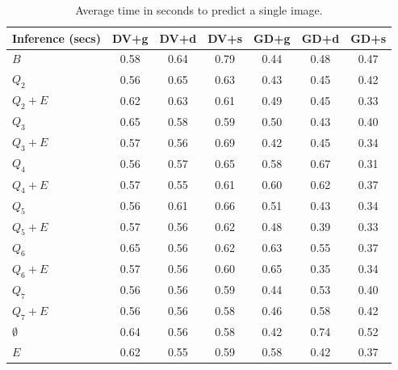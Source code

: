 \begin{table}[h]
  \centering
  \begin{tabular}{l|c|c|c|c|c|c}
    \hline
    \multicolumn{1}{c}{\bfseries Inference (secs)} & \multicolumn{1}{c}{\bfseries DV+g} &
    \multicolumn{1}{c}{\bfseries DV+d} & \multicolumn{1}{c}{\bfseries DV+s} &
    \multicolumn{1}{c}{\bfseries GD+g} & \multicolumn{1}{c}{\bfseries GD+d} &
    \multicolumn{1}{c}{\bfseries GD+s}\\
    \hline
    $B$         & 0.58 & 0.64 & 0.79 & 0.44 & 0.48 & 0.47 \\
    $Q_2$       & 0.56 & 0.65 & 0.63 & 0.43 & 0.45 & 0.42 \\
    $Q_2+E$     & 0.62 & 0.63 & 0.61 & 0.49 & 0.45 & 0.33 \\
    $Q_3$       & 0.65 & 0.58 & 0.59 & 0.50 & 0.43 & 0.40 \\
    $Q_3+E$     & 0.57 & 0.56 & 0.69 & 0.42 & 0.45 & 0.34 \\
    $Q_4$       & 0.56 & 0.57 & 0.65 & 0.58 & 0.67 & 0.31 \\
    $Q_4+E$     & 0.57 & 0.55 & 0.61 & 0.60 & 0.62 & 0.37 \\
    $Q_5$       & 0.56 & 0.61 & 0.66 & 0.51 & 0.43 & 0.34 \\
    $Q_5+E$     & 0.57 & 0.56 & 0.62 & 0.48 & 0.39 & 0.33 \\
    $Q_6$       & 0.65 & 0.56 & 0.62 & 0.63 & 0.55 & 0.37 \\
    $Q_6+E$     & 0.57 & 0.56 & 0.60 & 0.65 & 0.35 & 0.34 \\
    $Q_7$       & 0.56 & 0.56 & 0.59 & 0.44 & 0.53 & 0.40 \\
    $Q_7+E$     & 0.56 & 0.56 & 0.58 & 0.46 & 0.58 & 0.42 \\
    $\emptyset$ & 0.64 & 0.56 & 0.58 & 0.42 & 0.74 & 0.52 \\
    $E$         & 0.62 & 0.55 & 0.59 & 0.58 & 0.42 & 0.37 \\
  \end{tabular}
  \caption{Average time in seconds to predict a single image.\label{tab:time-inference}}
\end{table}

